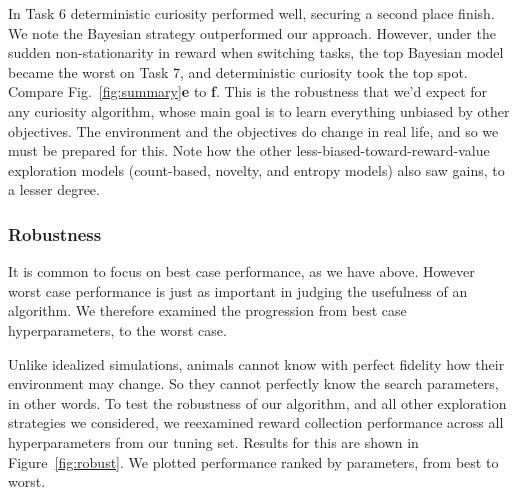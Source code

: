 In Task 6 deterministic curiosity performed well, securing a second place finish. We note the Bayesian strategy  outperformed our approach. However, under the sudden non-stationarity in reward when switching tasks, the top Bayesian model became the worst on Task 7, and deterministic curiosity took the top spot. Compare Fig.~\ref{fig:summary}\textbf{e} to \textbf{f}. This is the robustness that we'd expect for any curiosity algorithm, whose main goal is to learn everything unbiased by other objectives. The environment and the objectives do change in real life, and so we must be prepared for this. Note how the other less-biased-toward-reward-value exploration models (count-based, novelty, and entropy models) also saw gains, to a lesser degree.

\subsubsection*{Robustness}
It is common to focus on best case performance, as we have above. However worst case performance is just as important in judging the usefulness of an algorithm. We therefore examined the progression from best case hyperparameters, to the worst case.  

Unlike idealized simulations, animals cannot know with perfect fidelity how their environment may change. So they cannot perfectly know the search parameters, in other words. To test the robustness of our algorithm, and all other exploration strategies we considered, we reexamined reward collection performance across all hyperparameters from our tuning set. Results for this are shown in Figure~\ref{fig:robust}. We plotted performance ranked by parameters, from best to worst.

